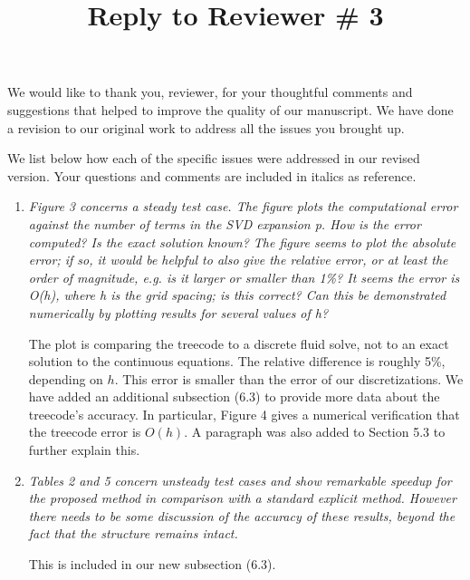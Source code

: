 \documentclass[12pt]{article}
\title{Reply to Reviewer \# 3}
\author{}
\begin{document}
\maketitle
We would like to thank you,  reviewer,  for your thoughtful  comments and suggestions that helped to improve  the quality of our manuscript. 
We have done a revision to our original work to address all the issues you brought up.


We list below how each of the specific issues were addressed in our revised version. Your questions and comments are included in italics as reference.



\begin{enumerate}
\item {\em Figure 3 concerns a steady test case. The figure plots the
computational error against the number of terms in the SVD expansion p.
How is the error computed? Is the exact solution known? The figure seems
to plot the absolute error; if so, it would be helpful to also give the
relative error, or at least the order of magnitude, e.g. is it larger or
smaller than 1\%? It seems the error is O(h), where h is the grid spacing;
is this correct? Can this be demonstrated numerically by plotting results
for several values of h?}

 The plot is comparing the treecode to a discrete fluid solve, not
to an exact solution to the continuous equations. The relative difference
is roughly 5\%, depending on $h$. This error is smaller than the error of our
discretizations. We have added an additional subsection (6.3) to provide more data about the treecode's accuracy. In
particular,  Figure 4 gives a numerical verification that the treecode
error is $O(h)$. A paragraph was also added to Section 5.3 to further explain this.



\item {\em Tables 2 and 5 concern unsteady test cases and show remarkable speedup
for the proposed method in comparison with a standard explicit method.
However there needs to be some discussion of the accuracy of these
results, beyond the fact that the structure remains intact.}

This is included in our new subsection (6.3).



\end{enumerate}


 
\end{document}
